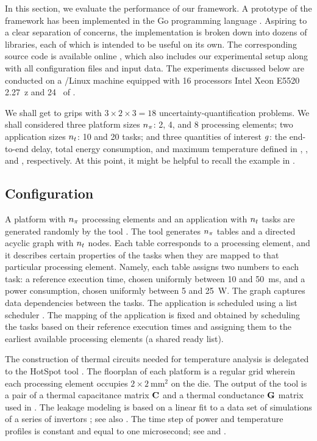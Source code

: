 In this section, we evaluate the performance of our framework. A prototype of
the framework has been implemented in the Go programming language \cite{go}.
Aspiring to a clear separation of concerns, the implementation is broken down
into dozens of libraries, each of which is intended to be useful on its own. The
corresponding source code is available online \cite{sources}, which also
includes our experimental setup along with all configuration files and input
data. The experiments discussed below are conducted on a /Linux machine
equipped with 16 processors Intel Xeon E5520 2.27~z and 24~ of
.

We shall get to grips with $3 \times 2 \times 3 = 18$ uncertainty-quantification
problems. We shall considered three platform sizes ${n_\pi}$: 2, 4, and 8
processing elements; two application sizes ${n_t}$: 10 and 20 tasks; and three
quantities of interest $g$: the end-to-end delay, total energy consumption, and
maximum temperature defined in , , and
, respectively. At this point, it might be helpful to
recall the example in .

\subsection{Configuration} 

A platform with ${n_\pi}$ processing elements and an application with ${n_t}$ tasks
are generated randomly by the  tool \cite{dick1998}. The tool generates
${n_\pi}$ tables and a directed acyclic graph with ${n_t}$ nodes. Each table
corresponds to a processing element, and it describes certain properties of the
tasks when they are mapped to that particular processing element. Namely, each
table assigns two numbers to each task: a reference execution time, chosen
uniformly between 10 and 50~ms, and a power consumption, chosen uniformly
between 5 and 25~W. The graph captures data dependencies between the tasks. The
application is scheduled using a list scheduler \cite{adam1974}. The mapping of
the application is fixed and obtained by scheduling the tasks based on their
reference execution times and assigning them to the earliest available
processing elements (a shared ready list).

The construction of thermal  circuits needed for temperature analysis is
delegated to the HotSpot tool \cite{skadron2004}. The floorplan of each platform
is a regular grid wherein each processing element occupies $2 \times
2~\text{mm}^2$ on the die. The output of the tool is a pair of a thermal
capacitance matrix $\mathbf{C}$ and a thermal conductance $\mathbf{G}$ matrix used in
. The leakage modeling is based on a linear fit to a data
set of  simulations of a series of  invertors
\cite{ukhov2012, liu2007}; see also \cite{ukhov2014}. The time step of power and
temperature profiles is constant and equal to one microsecond; see 
and .

